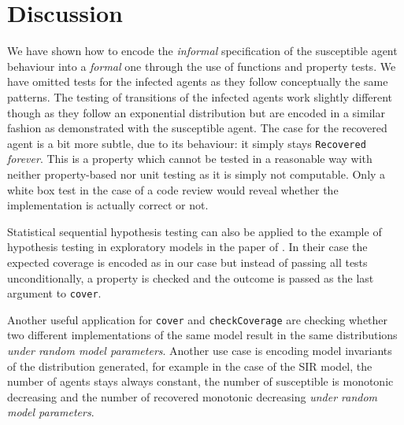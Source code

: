 \section{Discussion}
\label{sec:discussion}
We have shown how to encode the \textit{informal} specification of the susceptible agent behaviour into a \textit{formal} one through the use of functions and property tests. We have omitted tests for the infected agents as they follow conceptually the same patterns. The testing of transitions of the infected agents work slightly different though as they follow an exponential distribution but are encoded in a similar fashion as demonstrated with the susceptible agent. The case for the recovered agent is a bit more subtle, due to its behaviour: it simply stays \texttt{Recovered} \textit{forever}. This is a property which cannot be tested in a reasonable way with neither property-based nor unit testing as it is simply not computable. Only a white box test in the case of a code review would reveal whether the implementation is actually correct or not.
 
Statistical sequential hypothesis testing can also be applied to the example of hypothesis testing in exploratory models in the paper of \cite{thaler_show_2019}. In their case the expected coverage is encoded as in our case but instead of passing all tests unconditionally, a property is checked and the outcome is passed as the last argument to \texttt{cover}.

Another useful application for \texttt{cover} and \texttt{checkCoverage} are checking whether two different implementations of the same model result in the same distributions \textit{under random model parameters}. Another use case is encoding model invariants of the distribution generated, for example in the case of the SIR model, the number of agents stays always constant, the number of susceptible is monotonic decreasing and the number of recovered monotonic decreasing \textit{under random model parameters}.
